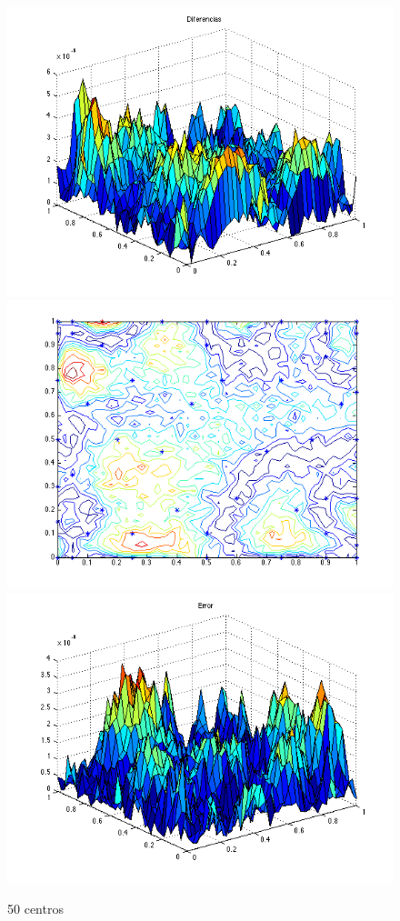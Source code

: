 \documentclass[11pt,a4paper]{article}
\begin{document}
\begin{figure}[H]
\centering

\includegraphics[scale=0.35]{diferencias50.png}
\includegraphics[scale=0.35]{centros50.png}
\includegraphics[scale=0.35]{error50.png}
\caption{50 centros}
\end{figure}
\end{document}
